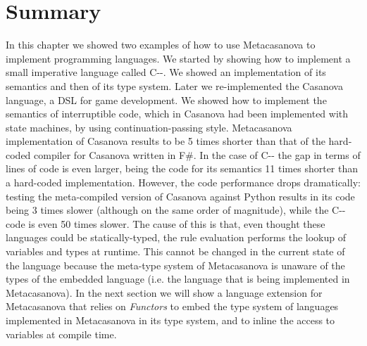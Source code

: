 \section{Summary}
In this chapter we showed two examples of how to use Metacasanova to implement programming languages. We started by showing how to implement a small imperative language called C-{}-. We showed an implementation of its semantics and then of its type system. Later we re-implemented the Casanova language, a DSL for game development. We showed how to implement the semantics of interruptible code, which in Casanova had been implemented with state machines, by using continuation-passing style. Metacasanova implementation of Casanova results to be 5 times shorter than that of the hard-coded compiler for Casanova written in F\#. In the case of C-{}- the gap in terms of lines of code is even larger, being the code for its semantics 11 times shorter than a hard-coded implementation. However, the code performance drops dramatically: testing the meta-compiled version of Casanova against Python results in its code being 3 times slower (although on the same order of magnitude), while the C-{}- code is even 50 times slower. The cause of this is that, even thought these languages could be statically-typed, the rule evaluation performs the lookup of variables and types at runtime. This cannot be changed in the current state of the language because the meta-type system of Metacasanova is unaware of the types of the embedded language (i.e. the language that is being implemented in Metacasanova). In the next section we will show a language extension for Metacasanova that relies on \textit{Functors} to embed the type system of languages implemented in Metacasanova in its type system, and to inline the access to variables at compile time.